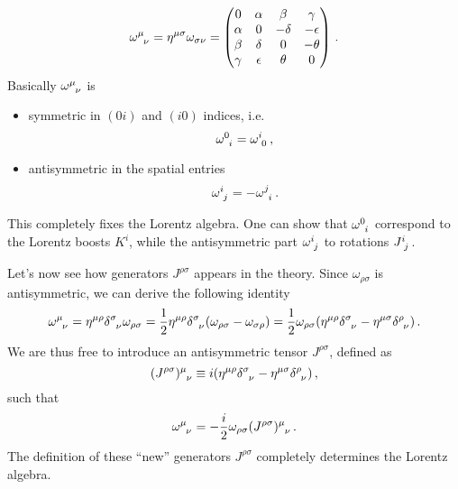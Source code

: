 \begin{sol}
\begin{equation}
        \tensor{\omega}{^\mu_\nu} = \g^{\mu\sigma} \omega_{\sigma \nu} = 
        \begin{pmatrix}
            0        & \alpha   & \beta    & \gamma \\
            \alpha   & 0        & - \delta & - \epsilon \\
            \beta    & \delta   & 0        & -\theta \\
            \gamma   & \epsilon & \theta & 0 
        \end{pmatrix} \, .
    \end{equation}
    Basically $\tensor{\omega}{^\mu_\nu}$ is
    \begin{itemize}
        \item symmetric in $(0i)$ and $(i0)$ indices, i.e.
        \begin{equation}
            \tensor{\omega}{^0_i} = \tensor{\omega}{^i_0} \, ,
        \end{equation}
    
        \item antisymmetric in the spatial entries
        \begin{equation}
            \tensor{\omega}{^i_j} = - \tensor{\omega}{^j_i} \, . 
        \end{equation}
    \end{itemize}
    This completely fixes the Lorentz algebra. One can show that $\tensor{\omega}{^0_i}$ correspond to the Lorentz boosts $K^i$, while the antisymmetric part $\tensor{\omega}{^i_j}$ to rotations $\tensor{J}{^i_j}$. 
    
    Let's now see how generators $J^{\rho\sigma}$ appears in the theory. Since $\omega_{\rho \sigma}$ is antisymmetric, we can derive the following identity
    \begin{equation}
        \tensor{\omega}{^\mu_\nu} = \g^{\mu\rho} \tensor{\delta}{^\sigma_\nu} \omega_{\rho \sigma} = \frac{1}{2} \g^{\mu\rho} \tensor{\delta}{^\sigma_\nu} (\omega_{\rho \sigma} - \omega_{\sigma \rho}) = \frac{1}{2} \omega_{\rho \sigma} (\g^{\mu \rho} \tensor{\delta}{^\sigma_\nu} - \g^{\mu \sigma} \tensor{\delta}{^\rho_\nu}) \, .
    \end{equation}
    We are thus free to introduce an antisymmetric tensor $J^{\rho\sigma}$, defined as
    \begin{equation}
        \tensor{(J^{\rho\sigma})}{^\mu_\nu} \define i (\g^{\mu \rho} \tensor{\delta}{^\sigma_\nu} - \g^{\mu \sigma} \tensor{\delta}{^\rho_\nu}) \, , 
        \label{Eq_Ex4_Jmunu_def}
    \end{equation}
    such that
    \begin{equation}
        \tensor{\omega}{^\mu_\nu} = - \frac{i}{2} \omega_{\rho\sigma}\tensor{(J^{\rho\sigma})}{^\mu_\nu} \, .
    \end{equation}
    The definition of these ``new'' generators $J^{\rho\sigma}$ completely determines the Lorentz algebra.
\end{sol}